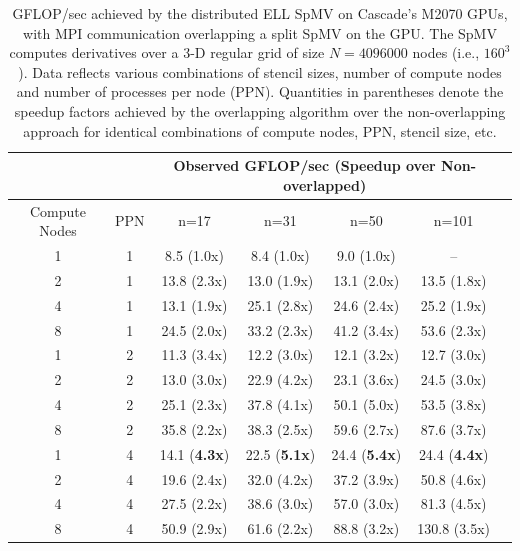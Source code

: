 \begin{table}[htb]
\centering
\caption{GFLOP/sec achieved by the distributed ELL SpMV on Cascade's M2070 GPUs, with MPI communication overlapping a split SpMV on the GPU. The SpMV computes derivatives over a 3-D regular grid of size $N=4096000$ nodes (i.e., $160^3$). Data reflects various combinations of stencil sizes, number of compute nodes and number of processes per node (PPN). Quantities in parentheses denote the speedup factors achieved by the overlapping algorithm over the non-overlapping approach for identical combinations of compute nodes, PPN, stencil size, etc. }
\label{tbl:cascade_m2070_overlap}
\begin{tabular}{c|c|c|c|c|c|c}
 \multicolumn{2}{c}{ } & \multicolumn{4}{|c|}{Observed GFLOP/sec (Speedup over Non-overlapped)} \\  \hline
Compute Nodes   &   PPN  &   n=17   &   n=31   &   n=50   &   n=101   \\ \hline
1   &   1   &   8.5 (1.0x)   &   8.4 (1.0x)   &   9.0 (1.0x)   &  --    \\
2   &   1   &   13.8 (2.3x)   &   13.0 (1.9x)   &   13.1 (2.0x)   &   13.5 (1.8x)   \\
4   &   1   &   13.1 (1.9x)   &   25.1 (2.8x)   &   24.6 (2.4x)   &   25.2 (1.9x)   \\
8   &   1   &   24.5 (2.0x)   &   33.2 (2.3x)   &   41.2 (3.4x)   &   53.6 (2.3x)   \\ \hline
1   &   2   &   11.3 (3.4x)   &   12.2 (3.0x)   &   12.1 (3.2x)   &   12.7 (3.0x)   \\
2   &   2   &   13.0 (3.0x)   &   22.9 (4.2x)   &   23.1 (3.6x)   &   24.5 (3.0x)   \\
4   &   2   &   25.1 (2.3x)   &   37.8 (4.1x)   &   50.1 (5.0x)   &   53.5 (3.8x)   \\
8   &   2   &   35.8 (2.2x)   &   38.3 (2.5x)   &   59.6 (2.7x)   &   87.6 (3.7x)   \\ \hline
1   &   4   &   14.1 (\textbf{4.3x})   &   22.5 (\textbf{5.1x})   &   24.4 (\textbf{5.4x})   &   24.4 (\textbf{4.4x})   \\
2   &   4   &   19.6 (2.4x)   &   32.0 (4.2x)   &   37.2 (3.9x)   &   50.8 (4.6x)   \\
4   &   4   &   27.5 (2.2x)   &   38.6 (3.0x)   &   57.0 (3.0x)   &   81.3 (4.5x)   \\
8   &   4   &   50.9 (2.9x)   &   61.6 (2.2x)   &   88.8 (3.2x)   &   130.8 (3.5x)  
\end{tabular} 
\end{table}


